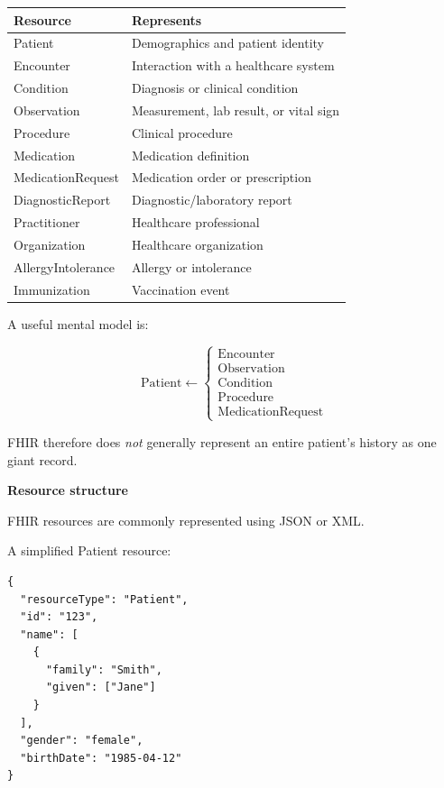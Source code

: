 \documentclass[11pt,letterpaper]{article}
\begin{document}
\begin{center}
\begin{tabularx}{\textwidth}{lX}
\toprule
Resource & Represents \\
\midrule
Patient & Demographics and patient identity \\
Encounter & Interaction with a healthcare system \\
Condition & Diagnosis or clinical condition \\
Observation & Measurement, lab result, or vital sign \\
Procedure & Clinical procedure \\
Medication & Medication definition \\
MedicationRequest & Medication order or prescription \\
DiagnosticReport & Diagnostic/laboratory report \\
Practitioner & Healthcare professional \\
Organization & Healthcare organization \\
AllergyIntolerance & Allergy or intolerance \\
Immunization & Vaccination event \\
\bottomrule
\end{tabularx}
\end{center}

A useful mental model is:

\[
\text{Patient}
\longleftarrow
\begin{cases}
\text{Encounter} \\
\text{Observation} \\
\text{Condition} \\
\text{Procedure} \\
\text{MedicationRequest}
\end{cases}
\]

FHIR therefore does \emph{not} generally represent an entire patient's
history as one giant record.

\textbf{Resource structure}

FHIR resources are commonly represented using JSON or XML.

A simplified Patient resource:

\begin{lstlisting}
{
  "resourceType": "Patient",
  "id": "123",
  "name": [
    {
      "family": "Smith",
      "given": ["Jane"]
    }
  ],
  "gender": "female",
  "birthDate": "1985-04-12"
}
\end{lstlisting}
\end{document}
